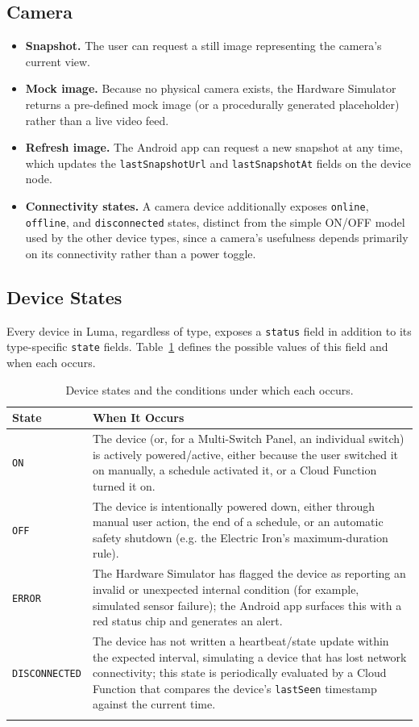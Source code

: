 \documentclass[11pt,a4paper]{article}
\begin{document}
\subsection{Camera}
\begin{itemize}
    \item \textbf{Snapshot.} The user can request a still image representing the camera's current view.
    \item \textbf{Mock image.} Because no physical camera exists, the Hardware Simulator returns a pre-defined mock image (or a procedurally generated placeholder) rather than a live video feed.
    \item \textbf{Refresh image.} The Android app can request a new snapshot at any time, which updates the \texttt{lastSnapshotUrl} and \texttt{lastSnapshotAt} fields on the device node.
    \item \textbf{Connectivity states.} A camera device additionally exposes \texttt{online}, \texttt{offline}, and \texttt{disconnected} states, distinct from the simple ON/OFF model used by the other device types, since a camera's usefulness depends primarily on its connectivity rather than a power toggle.
\end{itemize}

\subsection{Device States}
Every device in Luma, regardless of type, exposes a \texttt{status} field in addition to its type-specific \texttt{state} fields. Table~\ref{tab:device-states} defines the possible values of this field and when each occurs.

\begin{longtable}{@{}p{2.6cm}p{10.6cm}@{}}
\toprule
\textbf{State} & \textbf{When It Occurs} \\
\midrule
\endhead
\texttt{ON} & The device (or, for a Multi-Switch Panel, an individual switch) is actively powered/active, either because the user switched it on manually, a schedule activated it, or a Cloud Function turned it on. \\
\texttt{OFF} & The device is intentionally powered down, either through manual user action, the end of a schedule, or an automatic safety shutdown (e.g. the Electric Iron's maximum-duration rule). \\
\texttt{ERROR} & The Hardware Simulator has flagged the device as reporting an invalid or unexpected internal condition (for example, simulated sensor failure); the Android app surfaces this with a red status chip and generates an alert. \\
\texttt{DISCONNECTED} & The device has not written a heartbeat/state update within the expected interval, simulating a device that has lost network connectivity; this state is periodically evaluated by a Cloud Function that compares the device's \texttt{lastSeen} timestamp against the current time. \\
\bottomrule
\caption{Device states and the conditions under which each occurs.}
\label{tab:device-states}
\end{longtable}
\end{document}

